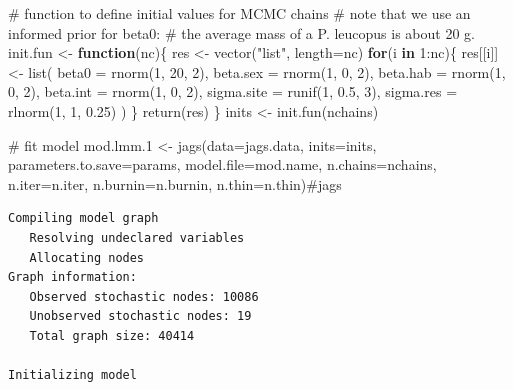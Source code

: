 \documentclass[
  13,
  letterpaper,
]{report}
\newenvironment{Shaded}{\begin{snugshade}}{\end{snugshade}}
\newcommand{\AttributeTok}[1]{\textcolor[rgb]{0.40,0.45,0.13}{#1}}
\newcommand{\CommentTok}[1]{\textcolor[rgb]{0.37,0.37,0.37}{#1}}
\newcommand{\ControlFlowTok}[1]{\textcolor[rgb]{0.00,0.23,0.31}{\textbf{#1}}}
\newcommand{\DecValTok}[1]{\textcolor[rgb]{0.68,0.00,0.00}{#1}}
\newcommand{\FloatTok}[1]{\textcolor[rgb]{0.68,0.00,0.00}{#1}}
\newcommand{\FunctionTok}[1]{\textcolor[rgb]{0.28,0.35,0.67}{#1}}
\newcommand{\NormalTok}[1]{\textcolor[rgb]{0.00,0.23,0.31}{#1}}
\newcommand{\OtherTok}[1]{\textcolor[rgb]{0.00,0.23,0.31}{#1}}
\newcommand{\SpecialCharTok}[1]{\textcolor[rgb]{0.37,0.37,0.37}{#1}}
\newcommand{\StringTok}[1]{\textcolor[rgb]{0.13,0.47,0.30}{#1}}
\begin{document}
\begin{Shaded}
\begin{Highlighting}[]
\CommentTok{\# function to define initial values for MCMC chains}
\CommentTok{\# note that we use an informed prior for beta0:}
\CommentTok{\# the average mass of a P. leucopus is about 20 g.}
\NormalTok{init.fun }\OtherTok{\textless{}{-}} \ControlFlowTok{function}\NormalTok{(nc)\{}
\NormalTok{    res }\OtherTok{\textless{}{-}} \FunctionTok{vector}\NormalTok{(}\StringTok{"list"}\NormalTok{, }\AttributeTok{length=}\NormalTok{nc)}
    \ControlFlowTok{for}\NormalTok{(i }\ControlFlowTok{in} \DecValTok{1}\SpecialCharTok{:}\NormalTok{nc)\{}
\NormalTok{        res[[i]] }\OtherTok{\textless{}{-}} \FunctionTok{list}\NormalTok{(}
            \AttributeTok{beta0 =} \FunctionTok{rnorm}\NormalTok{(}\DecValTok{1}\NormalTok{, }\DecValTok{20}\NormalTok{, }\DecValTok{2}\NormalTok{),}
            \AttributeTok{beta.sex =} \FunctionTok{rnorm}\NormalTok{(}\DecValTok{1}\NormalTok{, }\DecValTok{0}\NormalTok{, }\DecValTok{2}\NormalTok{),}
            \AttributeTok{beta.hab =} \FunctionTok{rnorm}\NormalTok{(}\DecValTok{1}\NormalTok{, }\DecValTok{0}\NormalTok{, }\DecValTok{2}\NormalTok{),}
            \AttributeTok{beta.int =} \FunctionTok{rnorm}\NormalTok{(}\DecValTok{1}\NormalTok{, }\DecValTok{0}\NormalTok{, }\DecValTok{2}\NormalTok{),}
            \AttributeTok{sigma.site =} \FunctionTok{runif}\NormalTok{(}\DecValTok{1}\NormalTok{, }\FloatTok{0.5}\NormalTok{, }\DecValTok{3}\NormalTok{),}
            \AttributeTok{sigma.res =} \FunctionTok{rlnorm}\NormalTok{(}\DecValTok{1}\NormalTok{, }\DecValTok{1}\NormalTok{, }\FloatTok{0.25}\NormalTok{)}
\NormalTok{        )}
\NormalTok{    \}}
    \FunctionTok{return}\NormalTok{(res)}
\NormalTok{\}}
\NormalTok{inits }\OtherTok{\textless{}{-}} \FunctionTok{init.fun}\NormalTok{(nchains)}

\CommentTok{\# fit model}
\NormalTok{mod.lmm}\FloatTok{.1} \OtherTok{\textless{}{-}} \FunctionTok{jags}\NormalTok{(}\AttributeTok{data=}\NormalTok{jags.data, }\AttributeTok{inits=}\NormalTok{inits,}
              \AttributeTok{parameters.to.save=}\NormalTok{params,}
              \AttributeTok{model.file=}\NormalTok{mod.name,}
              \AttributeTok{n.chains=}\NormalTok{nchains, }\AttributeTok{n.iter=}\NormalTok{n.iter,}
              \AttributeTok{n.burnin=}\NormalTok{n.burnin, }\AttributeTok{n.thin=}\NormalTok{n.thin)}\CommentTok{\#jags}
\end{Highlighting}
\end{Shaded}

\begin{verbatim}
Compiling model graph
   Resolving undeclared variables
   Allocating nodes
Graph information:
   Observed stochastic nodes: 10086
   Unobserved stochastic nodes: 19
   Total graph size: 40414

Initializing model
\end{verbatim}
\end{document}
